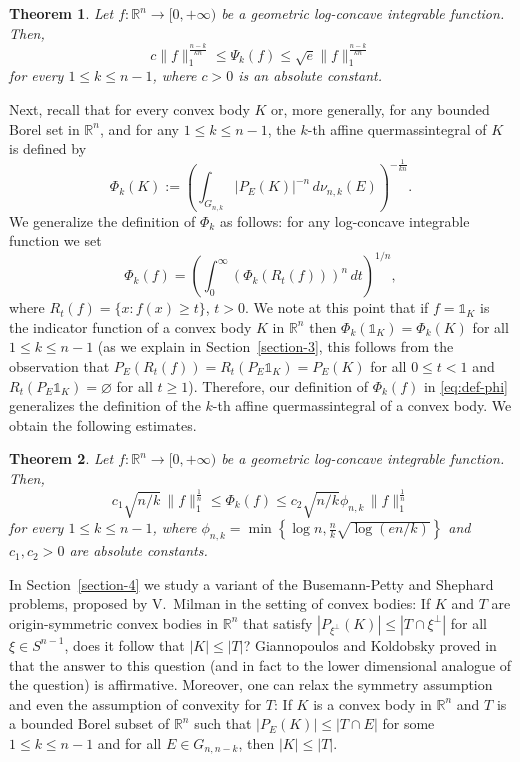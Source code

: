 \documentclass[11pt,leqno]{article}
\newtheorem{theorem}{Theorem}[section]
\theoremstyle{definition}
\theoremstyle{remark}
\numberwithin{equation}{section}
\newcommand{\ls}{\leqslant}
\newcommand{\gr}{\geqslant}
\newcommand{\1}{\textbf{1}}
\begin{document}
\begin{theorem}\label{th:intro-dual-functional}Let $f:{\mathbb R}^n\to [0,+\infty)$ be a geometric log-concave integrable
function. Then,
$$c\|f\|_1^{\frac{n-k}{kn}}\ls\Psi_k(f)\ls \sqrt{e}\|f\|_1^{\frac{n-k}{kn}}$$
for every $1\ls k\ls n-1$, where $c>0$ is an absolute constant.
\end{theorem}


Next, recall that for every convex body $K$ or, more generally, for any bounded Borel set in $\mathbb{R}^n$,
and for any $1\ls k \ls n-1$, the $k$-th affine quermassintegral of $K$ is defined by
$$\Phi_k(K) := \left( \int_{G_{n,k}} |P_E(K)|^{-n} \,d\nu_{n,k}(E) \right)^{-\frac{1}{kn}}.$$
We generalize the definition of $\Phi_k$ as follows: for any log-concave integrable function we set
\begin{equation}\label{eq:def-phi}\Phi_k(f)=\left(\int_0^{\infty}(\Phi_k(R_t(f)))^n\,dt\right)^{1/n},\end{equation}
where $R_t(f)=\{x:f(x)\gr t\}$, $t>0$. We note at this point that if $f=\mathds{1}_K$ is the indicator function
of a convex body $K$ in ${\mathbb R}^n$ then $\Phi_k(\mathds{1}_K)=\Phi_k(K)$ for all $1\ls k\ls n-1$ (as we explain in Section~\ref{section-3}, this follows from the observation that $P_E(R_t(f))=R_t(P_E\mathds{1}_K)=P_E(K)$ for
all $0\ls t<1$ and  $R_t(P_E\mathds{1}_K)=\varnothing$ for all $t\gr 1$). Therefore, our definition of $\Phi_k(f)$
in \eqref{eq:def-phi} generalizes the definition of the $k$-th affine quermassintegral of a convex body.
We obtain the following estimates.

\begin{theorem}\label{th:intro-functional}Let $f:{\mathbb R}^n\to [0,+\infty)$ be a geometric log-concave integrable
function. Then,
$$c_1\sqrt{n/k}\,\|f\|_1^{\frac{1}{n}}\ls \Phi_k(f)\ls c_2\sqrt{n/k}\phi_{n,k}\,\|f\|_1^{\frac{1}{n}}$$
for every $1\ls k\ls n-1$, where $\phi_{n,k}=\min\left\{\log n, \frac{n}{k}\sqrt{\log(en/k)}\right\}$ and $c_1,c_2>0$ are absolute constants.
\end{theorem}

In Section~\ref{section-4} we study a variant of the Busemann-Petty and Shephard problems, proposed by V.~Milman
in the setting of convex bodies: If $K$ and $T$ are origin-symmetric convex bodies
in ${\mathbb R}^n$ that satisfy $|P_{\xi^{\perp }}(K)|\ls |T\cap\xi^{\perp }|$
for all $\xi\in S^{n-1}$, does it follow that $|K|\ls |T|$?
Giannopoulos and Koldobsky proved in \cite{Giannopoulos-Koldobsky-2017} that the answer to this question
(and in fact to the lower dimensional analogue of the question) is affirmative. Moreover, one can relax the symmetry assumption
and even the assumption of convexity for $T$: If $K$ is a convex body in ${\mathbb R}^n$ and $T$ is a bounded
Borel subset of ${\mathbb R}^n$ such that $|P_E(K)|\ls |T\cap E|$ for some $1\ls k\ls n-1$ and for all
$E\in G_{n,n-k}$, then $|K|\ls |T|$.
\end{document}
